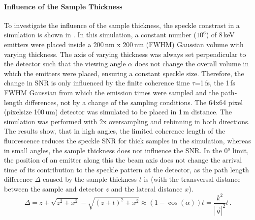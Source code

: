 \paragraph{Influence of the Sample Thickness}
To investigate the influence of the sample thickness, the speckle constrast in a simulation is shown in . In this simulation, a constant number ($10^6$) of 8\,keV emitters were placed inside a 200\,nm x 200\,nm (FWHM) Gaussian volume with varying thickness.  The axis of varying thickness was always set perpendicular to the detector such that the viewing angle $\alpha$ does not change the overall volume in which the emitters were placed, ensuring a constant speckle size. Therefore, the change in SNR is only influenced by the finite coherence time $\tau$=1\,fs, the 1\,fs FWHM Gaussian from which the emission times were sampled and the path-length differences, not by a change of the sampling conditions. The 64x64 pixel (pixelsize 100\,um) detector was simulated to be placed in 1\,m distance. The simulation was performed with 2x oversampling and rebinning in both directions.  
The results show, that in high angles, the limited coherence length of the fluorescence reduces the speckle SNR for thick samples in the simulation, whereas in small angles, the sample thickness does not influence the SNR. In the 0° limit, the position of an emitter along this the beam axis does not change the arrival time of its contribution to the speckle pattern at the detector, as the path length difference $\Delta$ caused by the sample thickness $t$ is (with the transversal distance between the sample and detector $z$ and the lateral distance $x$).
\begin{equation}
	\Delta=z+\sqrt{z^2+x^2}-\sqrt{(z+t)^2+x^2} \approx(1-\cos (\alpha)) t=\frac{k^2}{\left|\vec{q}\right|^2}t \,.
\end{equation}



